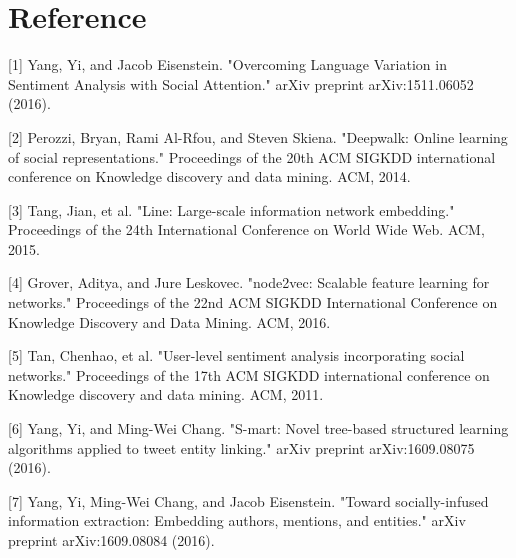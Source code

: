 
\section*{Reference}
\small

[1] Yang, Yi, and Jacob Eisenstein. "Overcoming Language Variation in Sentiment Analysis with Social Attention." arXiv preprint  arXiv:1511.06052 (2016).

[2] Perozzi, Bryan, Rami Al-Rfou, and Steven Skiena. "Deepwalk: Online learning of social representations." Proceedings of the 20th ACM SIGKDD international conference on Knowledge discovery and data mining. ACM, 2014.

[3] Tang, Jian, et al. "Line: Large-scale information network embedding." Proceedings of the 24th International Conference on World Wide Web. ACM, 2015.

[4] Grover, Aditya, and Jure Leskovec. "node2vec: Scalable feature learning for networks." Proceedings of the 22nd ACM SIGKDD International Conference on Knowledge Discovery and Data Mining. ACM, 2016.

[5] Tan, Chenhao, et al. "User-level sentiment analysis incorporating social networks." Proceedings of the 17th ACM SIGKDD international conference on Knowledge discovery and data mining. ACM, 2011.

[6] Yang, Yi, and Ming-Wei Chang. "S-mart: Novel tree-based structured learning algorithms applied to tweet entity linking." arXiv preprint arXiv:1609.08075 (2016).

[7] Yang, Yi, Ming-Wei Chang, and Jacob Eisenstein. "Toward socially-infused information extraction: Embedding authors, mentions, and entities." arXiv preprint arXiv:1609.08084 (2016).